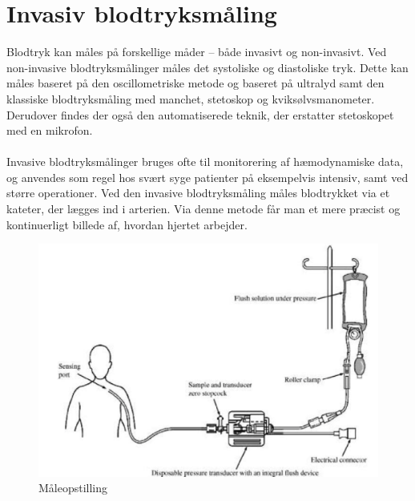 \section{Invasiv blodtryksmåling}
Blodtryk kan måles på forskellige måder – både invasivt og non-invasivt. Ved non-invasive blodtryksmålinger måles det systoliske og diastoliske tryk. Dette kan måles baseret på den oscillometriske metode og baseret på ultralyd samt den klassiske blodtryksmåling med manchet, stetoskop og kviksølvsmanometer. Derudover findes der også den automatiserede teknik, der erstatter stetoskopet med en mikrofon. \\\\
Invasive blodtryksmålinger bruges ofte til monitorering af hæmodynamiske data, og anvendes som regel hos svært syge patienter på eksempelvis intensiv, samt ved større operationer. Ved den invasive blodtryksmåling måles blodtrykket via et kateter, der lægges ind i arterien. Via denne metode får man et mere præcist og kontinuerligt billede af, hvordan hjertet arbejder. 

\begin{figure}[H]
	\centering
	\includegraphics[width=1\textwidth]{Figurer/Snip20151207_50}
	\caption{Måleopstilling}
\end{figure}

